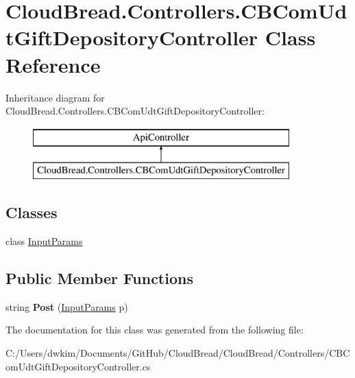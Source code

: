 \hypertarget{a00034}{}\section{Cloud\+Bread.\+Controllers.\+C\+B\+Com\+Udt\+Gift\+Depository\+Controller Class Reference}
\label{a00034}
Inheritance diagram for Cloud\+Bread.\+Controllers.\+C\+B\+Com\+Udt\+Gift\+Depository\+Controller\+:\begin{figure}[H]
\begin{center}
\leavevmode
\includegraphics[height=2.000000cm]{a00034}
\end{center}
\end{figure}
\subsection*{Classes}
\begin{DoxyCompactItemize}
\item 
class \hyperlink{a00092}{Input\+Params}
\end{DoxyCompactItemize}
\subsection*{Public Member Functions}
\begin{DoxyCompactItemize}
\item 
string {\bfseries Post} (\hyperlink{a00092}{Input\+Params} p)\hypertarget{a00034_a0ae6cc00b730b70f9ed6c5541f1bcc96}{}\label{a00034_a0ae6cc00b730b70f9ed6c5541f1bcc96}

\end{DoxyCompactItemize}


The documentation for this class was generated from the following file\+:\begin{DoxyCompactItemize}
\item 
C\+:/\+Users/dwkim/\+Documents/\+Git\+Hub/\+Cloud\+Bread/\+Cloud\+Bread/\+Controllers/C\+B\+Com\+Udt\+Gift\+Depository\+Controller.\+cs\end{DoxyCompactItemize}
